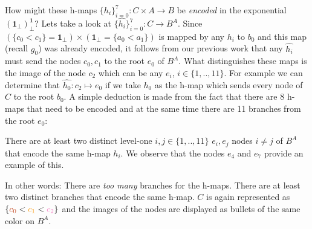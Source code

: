 How might these h-maps $\{h_i\}_{i=0}^7 : C \times A \rightarrow B$ be \emph{encoded} in the exponential $(\textbf{1}_\bot)^\textbf{1}_\bot$?
\newline\newline
Lets take a look at $\{\hat{h_i}\}_{i=0}^7 : C \rightarrow B^A$. 
\newline
Since $(\{c_0 < c_1\} = \textbf{1}_\bot) \times (\textbf{1}_\bot = \{a_0 < a_1\})$ is mapped by any $h_i$ to $b_0$ and this map (recall $g_0$) was already encoded, it follows from our previous work that
any $\hat{h_i}$ must send the nodes $c_0,c_1$ to the root $e_0$ of $B^A$. \newline 
What distinguishes these maps is the image of the node $c_2$  which can be any $e_i$, $i \in \{1,..,11\}$.
For example we can determine that  $\hat{h_0}: c_2 \mapsto e_0$ if we take $h_0$ as the h-map which sends every node of $C$ to the root $b_0$. 
\newline
A simple deduction is made from the fact that there are 8 h-maps that need to be encoded and at the same time there are 11 branches from the root $e_0$:
\begin{remark}
There are at least two distinct level-one  $i,j \in \{1,..,11\}$ $e_i,e_j$ nodes $i \neq j $ of $B^A$ that encode the same h-map $h_i$. 
We observe that the nodes $e_4$ and $e_7$ provide an example of this. 
\end{remark}
In other words: There are \emph{too many} branches for the h-maps. There are at least two distinct branches that encode the same h-map.
\newline
$C$ is again represented as $\{\textcolor{Bittersweet}{c_0} < \textcolor{YellowOrange}{c_1} < \textcolor{Lavender}{c_2}\}$ and the images of the nodes are displayed as bullets of the same color on $B^A$.
